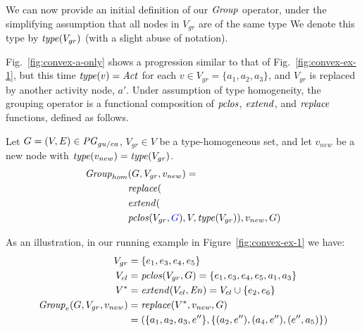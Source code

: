 We can now provide an initial definition of our $\mathit{Group}$ operator, under the simplifying assumption that all nodes in $V_{gr}$ are of the same type   We denote this type by $\mathit{type}(V_{gr})$ (with a slight abuse of notation). 

Fig.~\ref{fig:convex-a-only} shows a progression similar to that of Fig.~\ref{fig:convex-ex-1}, but this time $\mathit{type}(v) = \mathit{Act}$ for each $v \in V_{gr} = \{a_1, a_2, a_3\}$, and $V_{gr}$ is replaced by another activity node, $a'$.
%
Under assumption of type homogeneity, the grouping operator is a functional composition of $\mathit{pclos}$, $\mathit{extend}$, and $\mathit{replace}$ functions, defined as follows.

\vspace*{10pt}
\begin{definition}
Let $G=(V,E) \in \mathit{PG}_{gu/ea}$, $V_{gr} \in V$ be a type-homogeneous set, and let $v_{new}$ be a new node with $\mathit{type}(v_{new}) = \mathit{type}(V_{gr})$.
\begin{align*}
\group_{hom} &  (G, V_{gr}, v_{new}) = \\
 & \repl(  \\
 & \extend( \\
 & \clos(V_{gr},\jwb{G}), V, \type(V_{gr})), v_{new},  G ) 
\end{align*}
\label{def:homo-group}
\end{definition}

As an illustration, in our running example in Figure~\ref{fig:convex-ex-1} we have: %
\begin{align*}
V_{gr} &= \{e_1, e_3, e_4, e_5\} \\
V_{cl} & = \mathit{pclos}(V_{gr},G) = \{e_1, e_3, e_4, e_5, a_1, a_3\} \\
V^{*} & = \mathit{extend}(V_{cl}, \mathit{En}) = V_{cl} \cup  \{e_2, e_6 \} \\
\mathit{Group}_e(G, V_{gr}, v_{new}) & = \mathit{replace}(V^{*}, v_{new}, G) \\
& = (\{a_1,a_2,a_3,e''\}, \{ (a_2, e''), (a_4, e''), (e'',a_5) \})
\end{align*}


%


